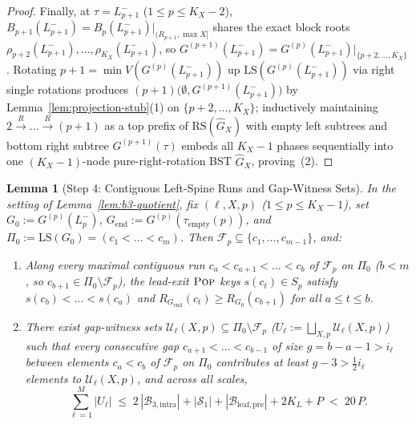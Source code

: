 \documentclass[11pt]{article}
\newtheorem{lemma}[theorem]{Lemma}
\theoremstyle{definition}
\theoremstyle{remark}
\newcommand{\LS}{\mathrm{LS}}
\newcommand{\RS}{\mathrm{RS}}
\newcommand{\POP}{\textnormal{\scshape Pop}}
\begin{document}
\begin{proof}
Finally, at $\tau = L_{p+1}^-$ ($1 \le p \le K_X - 2$), $B_{p+1}(L_{p+1}^-) = B_p(L_{p+1}^-)|_{(R_{p+1}, \max X]}$ shares the exact block roots $\rho_{p+2}(L_{p+1}^-), \dots, \rho_{K_X}(L_{p+1}^-)$, so $G^{(p+1)}(L_{p+1}^-) = G^{(p)}(L_{p+1}^-)|_{\{p+2, \dots, K_X\}}$. Rotating $p + 1 = \min V(G^{(p)}(L_{p+1}^-))$ up $\LS(G^{(p)}(L_{p+1}^-))$ via right single rotations produces $(p + 1)\big(\emptyset, G^{(p+1)}(L_{p+1}^-)\big)$ by Lemma~\ref{lem:projection-stub}(1) on $\{p + 2, \dots, K_X\}$; inductively maintaining $2 \xrightarrow{R} \dots \xrightarrow{R} (p + 1)$ as a top prefix of $\RS(\widehat{G}_X)$ with empty left subtrees and bottom right subtree $G^{(p+1)}(\tau)$ embeds all $K_X - 1$ phases sequentially into one $(K_X - 1)$-node pure-right-rotation BST $\widehat{G}_X$, proving~(2).
\end{proof}

\begin{lemma}[Step 4: Contiguous Left-Spine Runs and Gap-Witness Sets]
\label{lem:b3-gaps}
In the setting of Lemma~\ref{lem:b3-quotient}, fix $(\ell, X, p)$ ($1 \le p \le K_X - 1$), set $G_0 := G^{(p)}(L_p^-)$, $G_{\mathrm{end}} := G^{(p)}(\tau_{\mathrm{empty}}(p))$, and $\Pi_0 := \LS(G_0) = (c_1 < \dots < c_m)$. Then $\mathcal{F}_p \subseteq \{c_1, \dots, c_{m-1}\}$, and:
\begin{enumerate}[label=(\arabic*)]
  \item Along every maximal contiguous run $c_a < c_{a+1} < \dots < c_b$ of $\mathcal{F}_p$ on $\Pi_0$ ($b < m$, so $c_{b+1} \in \Pi_0 \setminus \mathcal{F}_p$), the lead-exit $\POP$ keys $s(c_t) \in S_p$ satisfy $s(c_b) < \dots < s(c_a)$ and $R_{G_{\mathrm{end}}}(c_t) \ge R_{G_0}(c_{b+1})$ for all $a \le t \le b$.
  \item There exist gap-witness sets $\mathcal{U}_\ell(X, p) \subseteq \Pi_0 \setminus \mathcal{F}_p$ ($U_\ell := \bigsqcup_{X, p} \mathcal{U}_\ell(X, p)$) such that every consecutive gap $c_{a+1} < \dots < c_{b-1}$ of size $g = b - a - 1 > i_\ell$ between elements $c_a < c_b$ of $\mathcal{F}_p$ on $\Pi_0$ contributes at least $g - 3 > \frac{1}{2} i_\ell$ elements to $\mathcal{U}_\ell(X, p)$, and across all scales,
  \begin{equation}
  \label{eq:U-pool}
  \sum_{\ell=1}^M |U_\ell| \;\le\; 2\,|\mathcal{B}_{3,\mathrm{intra}}| + |\mathcal{S}_1| + |\mathcal{B}_{\mathrm{leaf,pre}}| + 2 K_L + P \;<\; 20\,P.
  \end{equation}
\end{enumerate}
\end{lemma}
\end{document}
